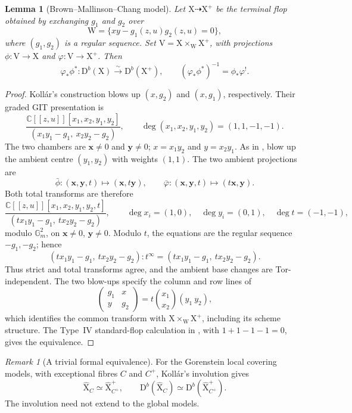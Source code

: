 \documentclass[a4paper,10pt]{article}
\newcommand{\X}{\mathrm{X}}
\newcommand{\W}{\mathrm{W}}
\newcommand{\V}{\mathrm{V}}
\newcommand{\Db}{\mathrm{D}^b}
\newtheorem{lemma}{Lemma}
\theoremstyle{remark}
\newtheorem{remark}{Remark}
\theoremstyle{plain}
\begin{document}
\begin{lemma}[Brown--Mallinson--Chang model]\label{lem:diagonal}
Let $\X\dashrightarrow\X^+$ be the terminal flop obtained by exchanging
$g_1$ and $g_2$ over
\[
\W=\{xy-g_1(z,u)g_2(z,u)=0\},
\]
where $(g_1,g_2)$ is a regular sequence. Set $\V=\X\times_\W\X^+$,
with projections $\phi:\V\to\X$ and $\varphi:\V\to\X^+$. Then
\[
\varphi_*\phi^*:\Db(\X)\xrightarrow{\sim}\Db(\X^+),
\qquad
(\varphi_*\phi^*)^{-1}=\phi_*\varphi^!.
\]
\end{lemma}
\begin{proof}
Koll\'ar's construction \cite[(2.2.2.2)]{KollarSurvey} blows up
$(x,g_2)$ and $(x,g_1)$, respectively. Their graded GIT presentation is
\cite{Brown,Chang,Mallinson}
\begin{equation}\label{eq:diagonal-cox}
\frac{\mathds{C}[[z,u]][x_1,x_2,y_1,y_2]}
{(x_1y_1-g_1,\ x_2y_2-g_2)},
\qquad
\deg(x_1,x_2,y_1,y_2)=(1,1,-1,-1).
\end{equation}
The two chambers are $\mathbf x\ne0$ and $\mathbf y\ne0$;
$x=x_1y_2$ and $y=x_2y_1$.
As in \cite{HaoIIa}, blow up the ambient centre $(y_1,y_2)$ with
weights $(1,1)$. The two ambient projections are
\[
\bar\phi:(\mathbf x,\mathbf y,t)\longmapsto(\mathbf x,t\mathbf y),
\qquad
\bar\varphi:(\mathbf x,\mathbf y,t)\longmapsto(t\mathbf x,\mathbf y).
\]
Both total transforms are therefore
\begin{equation}\label{eq:diagonal-roof}
\frac{\mathds{C}[[z,u]][x_1,x_2,y_1,y_2,t]}
{(tx_1y_1-g_1,\ tx_2y_2-g_2)},
\qquad
\deg x_i=(1,0),\quad\deg y_i=(0,1),\quad\deg t=(-1,-1),
\end{equation}
modulo $\mathbb G_m^2$, on $\mathbf x\ne0$, $\mathbf y\ne0$.
Modulo $t$, the equations are the regular sequence $-g_1,-g_2$; hence
\[
(tx_1y_1-g_1,\ tx_2y_2-g_2):t^\infty
=(tx_1y_1-g_1,\ tx_2y_2-g_2).
\]
Thus strict and total transforms agree, and the ambient base changes
are Tor-independent. The two blow-ups specify the column and row lines of
\[
\begin{pmatrix}g_1&x\\y&g_2\end{pmatrix}
=t\binom{x_1}{x_2}(y_1\ y_2),
\]
which identifies the common transform with $\X\times_\W\X^+$,
including its scheme structure. The Type~IV standard-flop calculation
in \cite{HaoIIa}, with $1+1-1-1=0$, gives the equivalence.
\end{proof}

\medskip
\begin{remark}[A trivial formal equivalence]
For the Gorenstein local covering models, with exceptional fibres $C$
and $C^+$, Koll\'ar's involution \cite{Kollar} gives
\[
\widehat{\X}_C\simeq\widehat{\X}^+_{C^+},
\qquad
\Db(\widehat{\X}_C)\simeq\Db(\widehat{\X}^+_{C^+}).
\]
The involution need not extend to the global models.
\end{remark}
\end{document}
